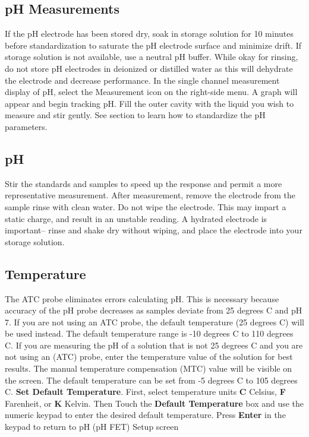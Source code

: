 \documentclass[12pt]{../SOP3_beta}\usepackage[]{graphicx}\usepackage[]{color}
\begin{document}
\subsection{pH Measurements}
\NP If the pH electrode has been stored dry, soak in storage solution for 10 minutes before standardization to saturate the pH electrode surface and minimize drift. If storage solution is not available, use a neutral pH buffer. While okay for rinsing, do not store pH electrodes in deionized or distilled water as this will dehydrate the electrode and decrease performance.
\NP In the single channel measurement display of pH, select the Measurement icon on the right-side menu. A graph will appear and begin tracking pH.
\NP Fill the outer cavity with the liquid you wish to measure and stir gently.
\NP See section   to learn how to standardize the pH parameters.

\subsection{pH}

\NP 
\NP Stir the standards and samples to speed up the response and permit a more representative measurement. 
\NP After measurement, remove the electrode from the sample rinse with clean water. Do not wipe the electrode. This may impart a static charge, and result in an unstable reading. A hydrated electrode is important– rinse and shake dry without wiping, and place the electrode into your storage solution.

\subsection{Temperature}
\NP The ATC probe eliminates errors calculating pH. This is necessary because accuracy of the pH probe decreases as samples deviate from 25 degrees C and pH 7. If you are not using an ATC probe, the default temperature (25 degrees C) will be used instead. The default temperature range is -10 degrees C to 110 degrees C. 
\NP If  you  are measuring the  pH  of  a  solution  that  is  not  25 degrees C  and  you  are  not  using  an (ATC)  probe, enter  the  temperature  value  of  the  solution  for  best  results.
The manual temperature compensation (MTC) value will be visible on the screen. The default temperature can be set from -5 degrees C to 105 degrees C.
\NP\textbf{Set Default Temperature}. First, select temperature units \textbf{C} Celsius, \textbf{F} Farenheit, or \textbf{K} Kelvin. Then Touch the \textbf{Default Temperature} box and use the numeric keypad to enter the desired default temperature.
Press \textbf{Enter} in the keypad to return to pH (pH FET) Setup screen
\end{document}
